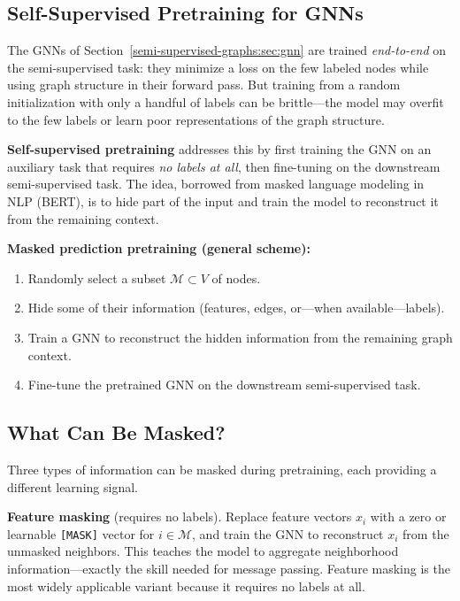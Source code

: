 \begin{notechapter}
\section{Self-Supervised Pretraining for GNNs}
\label{semi-supervised-graphs:sec:mlp}

The GNNs of Section~\ref{semi-supervised-graphs:sec:gnn} are trained \emph{end-to-end} on the
semi-supervised task: they minimize a loss on the few labeled nodes while using
graph structure in their forward pass. But training from a random initialization
with only a handful of labels can be brittle---the model may overfit to the few
labels or learn poor representations of the graph structure.

\textbf{Self-supervised pretraining} addresses this by first training the GNN
on an auxiliary task that requires \emph{no labels at all}, then fine-tuning
on the downstream semi-supervised task. The idea, borrowed from masked language
modeling in NLP (BERT), is to hide part of the input and train the model to
reconstruct it from the remaining context.

\begin{maskbox}
\textbf{Masked prediction pretraining (general scheme):}
\begin{enumerate}
    \item Randomly select a subset $\mathcal{M} \subset V$ of nodes.
    \item Hide some of their information (features, edges, or---when
          available---labels).
    \item Train a GNN to reconstruct the hidden information from the
          remaining graph context.
    \item Fine-tune the pretrained GNN on the downstream semi-supervised task.
\end{enumerate}
\end{maskbox}

\subsection{What Can Be Masked?}

Three types of information can be masked during pretraining, each providing a
different learning signal.

\textbf{Feature masking} (requires no labels). Replace feature vectors $x_i$
with a zero or learnable \texttt{[MASK]} vector for $i \in \mathcal{M}$, and
train the GNN to reconstruct $x_i$ from the unmasked neighbors. This teaches
the model to aggregate neighborhood information---exactly the skill needed for
message passing. Feature masking is the most widely applicable variant because
it requires no labels at all.


\end{notechapter}
